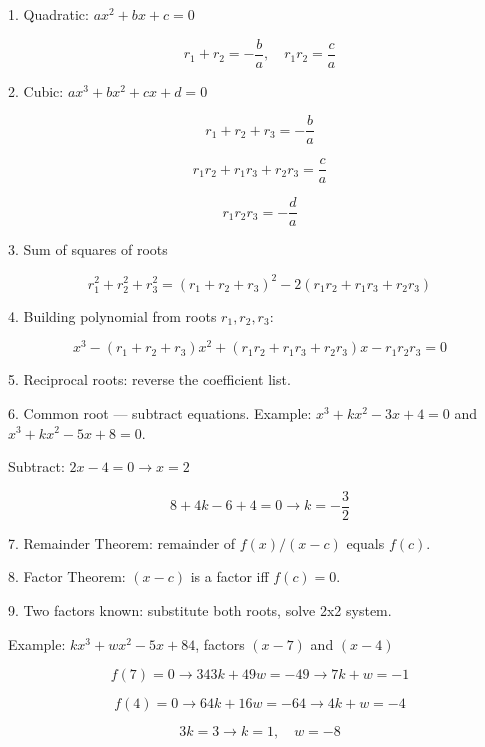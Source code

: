 1. Quadratic: $ax^2 + bx + c = 0$

$$ r_1 + r_2 = -\frac{b}{a}, \quad r_1 r_2 = \frac{c}{a} $$

2. Cubic: $ax^3 + bx^2 + cx + d = 0$

$$ r_1+r_2+r_3 = -\frac{b}{a} $$

$$ r_1r_2 + r_1r_3 + r_2r_3 = \frac{c}{a} $$

$$ r_1r_2r_3 = -\frac{d}{a} $$

3. Sum of squares of roots

$$ r_1^2+r_2^2+r_3^2 = (r_1+r_2+r_3)^2 - 2(r_1r_2+r_1r_3+r_2r_3) $$

4. Building polynomial from roots $r_1, r_2, r_3$:

$$ x^3 - (r_1+r_2+r_3)x^2 + (r_1r_2+r_1r_3+r_2r_3)x - r_1r_2r_3 = 0 $$

5. Reciprocal roots: reverse the coefficient list.

6. Common root — subtract equations. Example: $x^3+kx^2-3x+4=0$ and $x^3+kx^2-5x+8=0$.

Subtract: $2x-4=0 \rightarrow x=2$

$$ 8+4k-6+4=0 \rightarrow k=-\frac{3}{2} $$

7. Remainder Theorem: remainder of $f(x)/(x-c)$ equals $f(c)$.

8. Factor Theorem: $(x-c)$ is a factor iff $f(c) = 0$.

9. Two factors known: substitute both roots, solve 2x2 system.

Example: $kx^3+wx^2-5x+84$, factors $(x-7)$ and $(x-4)$

$$ f(7) = 0 \rightarrow 343k+49w = -49 \rightarrow 7k+w=-1 $$

$$ f(4) = 0 \rightarrow 64k+16w=-64 \rightarrow 4k+w=-4 $$

$$ 3k=3 \rightarrow k=1, \quad w=-8 $$
